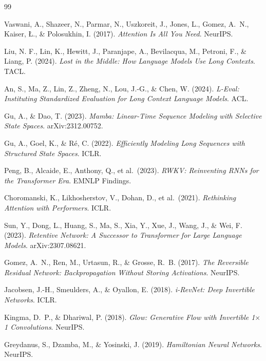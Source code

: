 \documentclass[11pt]{article}
\begin{document}
\begin{thebibliography}{99}
\setlength{\itemsep}{2pt}

Vaswani, A., Shazeer, N., Parmar, N., Uszkoreit, J., Jones, L., Gomez, A.~N.,
Kaiser, \L., \& Polosukhin, I. (2017).
\emph{Attention Is All You Need}.
NeurIPS.

Liu, N. F., Lin, K., Hewitt, J., Paranjape, A., Bevilacqua, M., Petroni, F.,
\& Liang, P. (2024).
\emph{Lost in the Middle: How Language Models Use Long Contexts}.
TACL.

An, S., Ma, Z., Lin, Z., Zheng, N., Lou, J.-G., \& Chen, W. (2024).
\emph{L-Eval: Instituting Standardized Evaluation for Long Context Language Models}.
ACL.

Gu, A., \& Dao, T. (2023).
\emph{Mamba: Linear-Time Sequence Modeling with Selective State Spaces}.
arXiv:2312.00752.

Gu, A., Goel, K., \& R\'e, C. (2022).
\emph{Efficiently Modeling Long Sequences with Structured State Spaces}.
ICLR.

Peng, B., Alcaide, E., Anthony, Q., et al.\ (2023).
\emph{RWKV: Reinventing RNNs for the Transformer Era}.
EMNLP Findings.

Choromanski, K., Likhosherstov, V., Dohan, D., et al.\ (2021).
\emph{Rethinking Attention with Performers}.
ICLR.

Sun, Y., Dong, L., Huang, S., Ma, S., Xia, Y., Xue, J., Wang, J., \& Wei, F. (2023).
\emph{Retentive Network: A Successor to Transformer for Large Language Models}.
arXiv:2307.08621.

Gomez, A.~N., Ren, M., Urtasun, R., \& Grosse, R.~B. (2017).
\emph{The Reversible Residual Network: Backpropagation Without Storing Activations}.
NeurIPS.

Jacobsen, J.-H., Smeulders, A., \& Oyallon, E. (2018).
\emph{i-RevNet: Deep Invertible Networks}.
ICLR.

Kingma, D.~P., \& Dhariwal, P. (2018).
\emph{Glow: Generative Flow with Invertible 1$\times$1 Convolutions}.
NeurIPS.

Greydanus, S., Dzamba, M., \& Yosinski, J. (2019).
\emph{Hamiltonian Neural Networks}.
NeurIPS.


\end{thebibliography}
\end{document}
